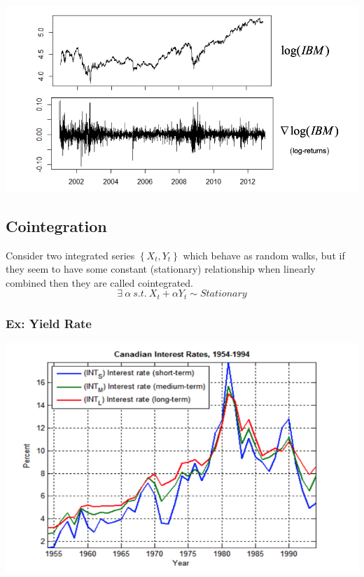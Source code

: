 \documentclass[
  oneside]{book}
\begin{document}
\includegraphics{Notes/Obsidian-Attachments/9-Statistical-Arbitrage-7.png}

\hypertarget{cointegration}{%
\subsection{Cointegration}\label{cointegration}}

Consider two integrated series \(\left\{ X_{t}, Y_{t} \right\}\) which behave as random walks, but if they seem to have some constant (stationary) relationship when linearly combined then they are called cointegrated.
\[
\exists \ \alpha\ s.t.\ X_{t} + \alpha Y_{t} \sim Stationary
\]

\hypertarget{ex-yield-rate}{%
\subsubsection{Ex: Yield Rate}\label{ex-yield-rate}}

\includegraphics{Notes/Obsidian-Attachments/9-Statistical-Arbitrage-8.png}
\end{document}
